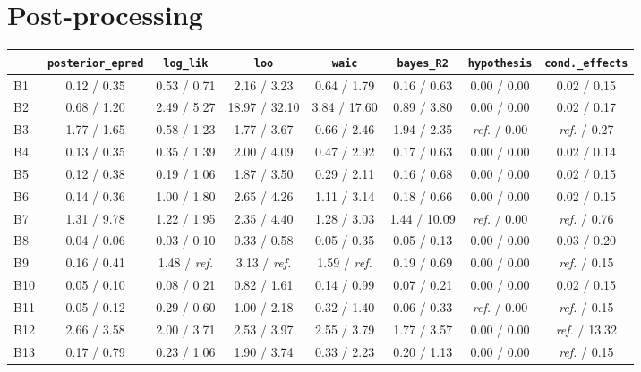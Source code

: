 \documentclass[11pt]{article}
\newcommand{\code}[1]{\texttt{#1}}
\begin{document}
\section{Post-processing}

\begin{table}[H]
\footnotesize
\setlength{\tabcolsep}{3pt}
\begin{center}
\begin{tabular}{@{}lccccccc@{}}
\toprule
& \code{posterior\_epred} & \code{log\_lik} & \code{loo} & \code{waic} & \code{bayes\_R2} & \code{hypothesis} & \code{cond.\_effects} \\
\midrule
B1 & 0.12 / 0.35 & 0.53 / 0.71 & 2.16 / 3.23 & 0.64 / 1.79 & 0.16 / 0.63 & 0.00 / 0.00 & 0.02 / 0.15 \\
B2 & 0.68 / 1.20 & 2.49 / 5.27 & 18.97 / 32.10 & 3.84 / 17.60 & 0.89 / 3.80 & 0.00 / 0.00 & 0.02 / 0.17 \\
B3 & 1.77 / 1.65 & 0.58 / 1.23 & 1.77 / 3.67 & 0.66 / 2.46 & 1.94 / 2.35 & \textit{ref.} / 0.00 & \textit{ref.} / 0.27 \\
B4 & 0.13 / 0.35 & 0.35 / 1.39 & 2.00 / 4.09 & 0.47 / 2.92 & 0.17 / 0.63 & 0.00 / 0.00 & 0.02 / 0.14 \\
B5 & 0.12 / 0.38 & 0.19 / 1.06 & 1.87 / 3.50 & 0.29 / 2.11 & 0.16 / 0.68 & 0.00 / 0.00 & 0.02 / 0.15 \\
B6 & 0.14 / 0.36 & 1.00 / 1.80 & 2.65 / 4.26 & 1.11 / 3.14 & 0.18 / 0.66 & 0.00 / 0.00 & 0.02 / 0.15 \\
B7 & 1.31 / 9.78 & 1.22 / 1.95 & 2.35 / 4.40 & 1.28 / 3.03 & 1.44 / 10.09 & \textit{ref.} / 0.00 & \textit{ref.} / 0.76 \\
B8 & 0.04 / 0.06 & 0.03 / 0.10 & 0.33 / 0.58 & 0.05 / 0.35 & 0.05 / 0.13 & 0.00 / 0.00 & 0.03 / 0.20 \\
B9 & 0.16 / 0.41 & 1.48 / \textit{ref.} & 3.13 / \textit{ref.} & 1.59 / \textit{ref.} & 0.19 / 0.69 & 0.00 / 0.00 & \textit{ref.} / 0.15 \\
B10 & 0.05 / 0.10 & 0.08 / 0.21 & 0.82 / 1.61 & 0.14 / 0.99 & 0.07 / 0.21 & 0.00 / 0.00 & 0.02 / 0.15 \\
B11 & 0.05 / 0.12 & 0.29 / 0.60 & 1.00 / 2.18 & 0.32 / 1.40 & 0.06 / 0.33 & \textit{ref.} / 0.00 & \textit{ref.} / 0.15 \\
B12 & 2.66 / 3.58 & 2.00 / 3.71 & 2.53 / 3.97 & 2.55 / 3.79 & 1.77 / 3.57 & 0.00 / 0.00 & \textit{ref.} / 13.32 \\
B13 & 0.17 / 0.79 & 0.23 / 1.06 & 1.90 / 3.74 & 0.33 / 2.23 & 0.20 / 1.13 & 0.00 / 0.00 & \textit{ref.} / 0.15 \\

\end{tabular}
\end{center}
\end{table}
\end{document}
